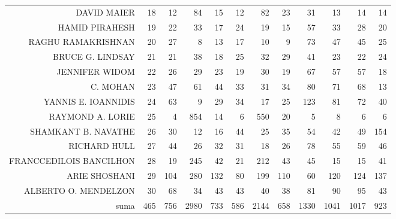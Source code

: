\documentclass{bakalarka}
\begin{document}
\begin{table}[!ht]
\begin{sideways}
\begin{scriptsize}
\begin{tabular}{r|r|rrrrrrrrrr}
DAVID MAIER&18&12&84&15&12&82&23&31&13&14&14\\
HAMID PIRAHESH&19&22&33&17&24&19&15&57&33&28&20\\
RAGHU RAMAKRISHNAN&20&27&8&13&17&10&9&73&47&45&25\\
BRUCE G. LINDSAY&21&21&38&18&25&32&29&41&23&22&24\\
JENNIFER WIDOM&22&26&29&23&19&30&19&67&57&57&18\\
C. MOHAN&23&47&61&44&33&31&34&80&71&68&13\\
YANNIS E. IOANNIDIS&24&63&9&29&34&17&25&123&81&72&40\\
RAYMOND A. LORIE&25&4&854&14&6&550&20&5&8&6&6\\
SHAMKANT B. NAVATHE&26&30&12&16&44&25&35&54&42&49&154\\
RICHARD HULL&27&44&26&32&31&18&26&78&55&59&46\\
FRANCCEDILOIS BANCILHON&28&19&245&42&21&212&43&45&15&15&41\\
ARIE SHOSHANI&29&104&280&132&80&199&110&60&120&124&137\\
ALBERTO O. MENDELZON&30&68&34&43&43&40&38&81&90&95&43\\
\midrule
suma&465&756&2980&733&586&2144&658&1330&1041&1017&923\\
\bottomrule
\end{tabular}
\end{scriptsize}
\end{sideways}
\end{table}
\end{document}
